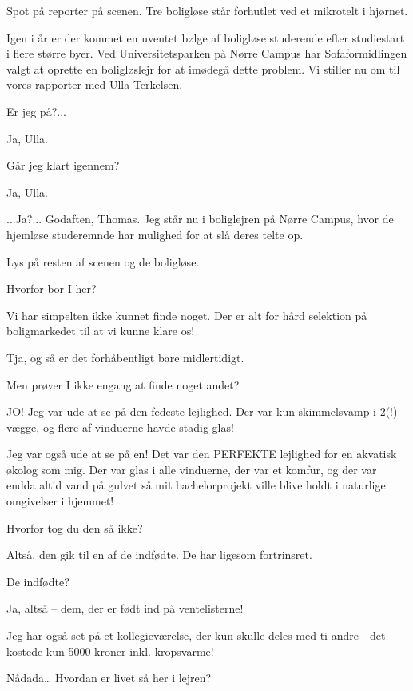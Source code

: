 \documentclass[a4paper,12pt]{article}
\begin{document}
\begin{sketch}


\scene Spot på reporter på scenen. Tre boligløse står forhutlet ved et mikrotelt i hjørnet.

 Igen i år er der kommet en uventet bølge af boligløse studerende efter studiestart i flere større byer. Ved Universitetsparken på Nørre Campus har Sofaformidlingen valgt at oprette en boligløslejr for at imødegå dette problem. Vi stiller nu om til vores rapporter med Ulla Terkelsen.

 Er jeg på?...  

 Ja, Ulla.

 Går jeg klart igennem?

 Ja, Ulla.

 ...Ja?... Godaften, Thomas. Jeg står nu i boliglejren på Nørre Campus, hvor de hjemløse studeremnde har mulighed for at slå deres telte op.

\scene Lys på resten af scenen og de boligløse.

 Hvorfor bor I her?

Vi har simpelten ikke kunnet finde noget. Der er alt for hård selektion på boligmarkedet til at vi kunne klare os! 

Tja, og så er det forhåbentligt bare midlertidigt.

 Men prøver I ikke engang at finde noget andet?

JO! Jeg var ude at se på den fedeste lejlighed. Der var kun skimmelsvamp i 2(!) vægge, og flere af vinduerne havde stadig glas!

 Jeg var også ude at se på en! Det var den PERFEKTE lejlighed for en akvatisk økolog som mig. Der var glas i alle vinduerne, der var et komfur, og der var endda altid vand på gulvet så mit bachelorprojekt ville blive holdt i naturlige omgivelser i hjemmet!

 Hvorfor tog du den så ikke?

Altså, den gik til en af de indfødte. De har ligesom fortrinsret.

 De indfødte?

Ja, altså -- dem, der er født ind på ventelisterne!

Jeg har også set på et kollegieværelse, der kun skulle deles med ti andre - det kostede kun 5000 kroner inkl. kropsvarme!

 Nådada\ldots
{} Hvordan er livet så her i lejren?


\end{sketch}
\end{document}
